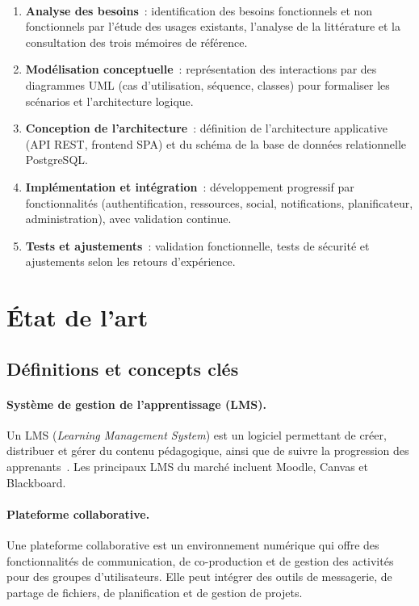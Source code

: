 ﻿﻿\documentclass[12pt,a4paper,oneside]{report}
\begin{document}
\begin{enumerate}
  \item \textbf{Analyse des besoins}~: identification des besoins fonctionnels et non fonctionnels par l'\'etude des usages existants, l'analyse de la litt\'erature et la consultation des trois m\'emoires de r\'ef\'erence.
  \item \textbf{Mod\'elisation conceptuelle}~: repr\'esentation des interactions par des diagrammes UML (cas d'utilisation, s\'equence, classes) pour formaliser les sc\'enarios et l'architecture logique.
  \item \textbf{Conception de l'architecture}~: d\'efinition de l'architecture applicative (API REST, frontend SPA) et du sch\'ema de la base de donn\'ees relationnelle PostgreSQL.
  \item \textbf{Impl\'ementation et int\'egration}~: d\'eveloppement progressif par fonctionnalit\'es (authentification, ressources, social, notifications, planificateur, administration), avec validation continue.
  \item \textbf{Tests et ajustements}~: validation fonctionnelle, tests de s\'ecurit\'e et ajustements selon les retours d'exp\'erience.
\end{enumerate}

\section{\'Etat de l'art}
\label{sec:etat_art}

\subsection{D\'efinitions et concepts cl\'es}

\paragraph{Syst\`eme de gestion de l'apprentissage (LMS).}
Un LMS (\textit{Learning Management System}) est un logiciel permettant de cr\'eer, distribuer et g\'erer du contenu p\'edagogique, ainsi que de suivre la progression des apprenants~\cite{moodle_overview_2026}. Les principaux LMS du march\'e incluent Moodle, Canvas et Blackboard.

\paragraph{Plateforme collaborative.}
Une plateforme collaborative est un environnement num\'erique qui offre des fonctionnalit\'es de communication, de co-production et de gestion des activit\'es pour des groupes d'utilisateurs. Elle peut int\'egrer des outils de messagerie, de partage de fichiers, de planification et de gestion de projets.
\end{document}
